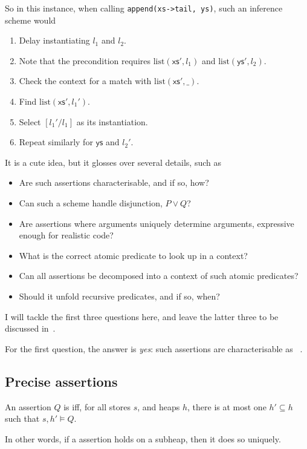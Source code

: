 So in this instance, when calling \texttt{append(xs->tail, ys)}, %
such an inference scheme would
\begin{enumerate}
    \item Delay instantiating $l_1$ and $l_2$.
    \item Note that the precondition requires $\mathrm{list}(\mathsf{xs}',
        l_1)$ and $\mathrm{list}(\mathsf{ys}', l_2)$.
    \item Check the context for a match with $\mathrm{list}(\mathsf{xs}',
        \_)$.
    \item Find $\mathrm{list}(\mathsf{xs}', l_1')$.
    \item Select $[l_1' / l_1]$ as its instantiation.
    \item Repeat similarly for $\mathsf{ys}$ and $l_2'$.
\end{enumerate}

It is a cute idea, but it glosses over several details, such as
\begin{itemize}
    \item Are such assertions characterisable, and if so, how?
    \item Can such a scheme handle disjunction, $ P \vee{} Q$?
    \item Are assertions where  arguments uniquely determine
         arguments, expressive enough for realistic code?
    \item What is the correct atomic predicate to look up in a context?
    \item Can all assertions be decomposed into a context of such atomic
        predicates?
    \item Should it unfold recursive predicates, and if so, when?
\end{itemize}

I will tackle the first three questions here, and leave the latter three
to be discussed in~.

For the first question, the answer is \emph{yes}: such assertions are
characterisable as ~.

\subsection{Precise assertions}\label{subsec:precise-assertion}

\begin{definition}%
\label{def:precise-assertion}
    \AP{} An assertion $Q$ is  iff, for all stores $s$, and heaps
    $h$, there is at most one $h' \subseteq{} h$ such that $s , h' \vDash{} Q$.

    In other words, if a  assertion holds on a subheap, then it
    does so uniquely.
\end{definition}

